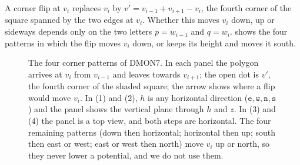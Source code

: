 \documentclass[11pt]{article}
\theoremstyle{plain}
\theoremstyle{definition}
\theoremstyle{remark}
\newcommand{\word}[1]{\texttt{#1}}
\newcommand{\dmon}[1]{\textup{DMON#1}}
\begin{document}
A corner flip at $v_i$ replaces $v_i$ by $v'=v_{i-1}+v_{i+1}-v_i$, the fourth corner of the square
spanned by the two edges at $v_i$. Whether this moves $v_i$ down, up or sideways depends only on the
two letters $p=w_{i-1}$ and $q=w_i$.  shows the four patterns in which the flip moves
$v_i$ down, or keeps its height and moves it south.

\begin{figure}[t]
\centering
\FigCorners
\caption{The four corner patterns of \dmon7. In each panel the polygon arrives at $v_i$ from $v_{i-1}$
and leaves towards $v_{i+1}$; the open dot is $v'$, the fourth corner of the shaded square; the arrow
shows where a flip would move $v_i$. In (1) and (2), $h$ is any horizontal direction
($\word{e},\word{w},\word{n},\word{s}$) and the panel shows the vertical plane through $h$ and $z$. In
(3) and (4) the panel is a top view, and both steps are horizontal. The four remaining patterns
(down then horizontal; horizontal then up; south then east or west; east or west then north) move
$v_i$ up or north, so they never lower a potential, and we do not use them.}
\label{fig:corners}
\end{figure}
\end{document}
